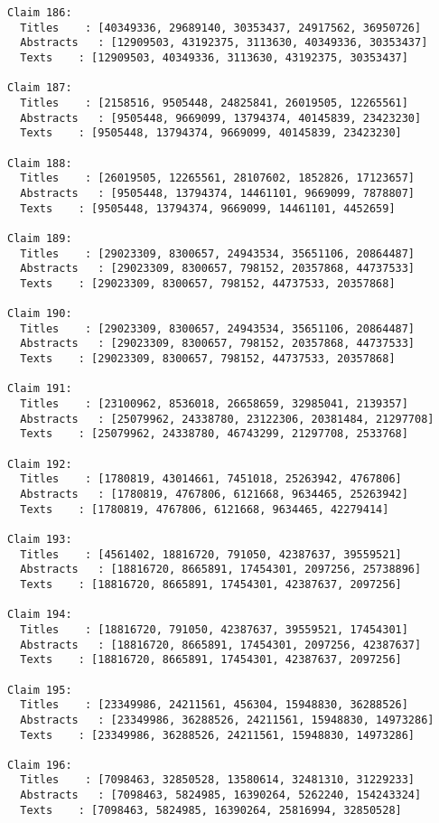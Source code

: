 \documentclass[11pt]{article}
\begin{document}
\begin{Verbatim}[commandchars=\\\{\}]
Claim 186:
  Titles    : [40349336, 29689140, 30353437, 24917562, 36950726]
  Abstracts   : [12909503, 43192375, 3113630, 40349336, 30353437]
  Texts    : [12909503, 40349336, 3113630, 43192375, 30353437]

Claim 187:
  Titles    : [2158516, 9505448, 24825841, 26019505, 12265561]
  Abstracts   : [9505448, 9669099, 13794374, 40145839, 23423230]
  Texts    : [9505448, 13794374, 9669099, 40145839, 23423230]

Claim 188:
  Titles    : [26019505, 12265561, 28107602, 1852826, 17123657]
  Abstracts   : [9505448, 13794374, 14461101, 9669099, 7878807]
  Texts    : [9505448, 13794374, 9669099, 14461101, 4452659]

Claim 189:
  Titles    : [29023309, 8300657, 24943534, 35651106, 20864487]
  Abstracts   : [29023309, 8300657, 798152, 20357868, 44737533]
  Texts    : [29023309, 8300657, 798152, 44737533, 20357868]

Claim 190:
  Titles    : [29023309, 8300657, 24943534, 35651106, 20864487]
  Abstracts   : [29023309, 8300657, 798152, 20357868, 44737533]
  Texts    : [29023309, 8300657, 798152, 44737533, 20357868]

Claim 191:
  Titles    : [23100962, 8536018, 26658659, 32985041, 2139357]
  Abstracts   : [25079962, 24338780, 23122306, 20381484, 21297708]
  Texts    : [25079962, 24338780, 46743299, 21297708, 2533768]

Claim 192:
  Titles    : [1780819, 43014661, 7451018, 25263942, 4767806]
  Abstracts   : [1780819, 4767806, 6121668, 9634465, 25263942]
  Texts    : [1780819, 4767806, 6121668, 9634465, 42279414]

Claim 193:
  Titles    : [4561402, 18816720, 791050, 42387637, 39559521]
  Abstracts   : [18816720, 8665891, 17454301, 2097256, 25738896]
  Texts    : [18816720, 8665891, 17454301, 42387637, 2097256]

Claim 194:
  Titles    : [18816720, 791050, 42387637, 39559521, 17454301]
  Abstracts   : [18816720, 8665891, 17454301, 2097256, 42387637]
  Texts    : [18816720, 8665891, 17454301, 42387637, 2097256]

Claim 195:
  Titles    : [23349986, 24211561, 456304, 15948830, 36288526]
  Abstracts   : [23349986, 36288526, 24211561, 15948830, 14973286]
  Texts    : [23349986, 36288526, 24211561, 15948830, 14973286]

Claim 196:
  Titles    : [7098463, 32850528, 13580614, 32481310, 31229233]
  Abstracts   : [7098463, 5824985, 16390264, 5262240, 154243324]
  Texts    : [7098463, 5824985, 16390264, 25816994, 32850528]


\end{Verbatim}
\end{document}
